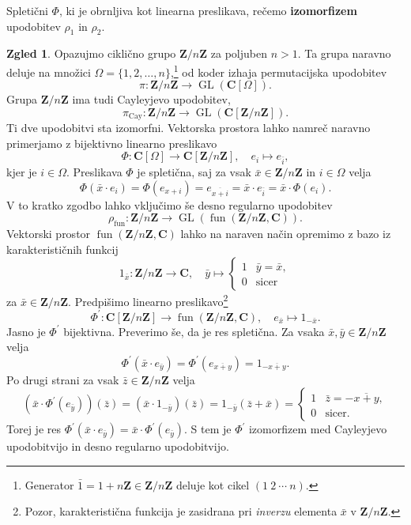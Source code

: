 \documentclass[11pt]{book}
\def\ZZ{\mathbf{Z}}
\def\CC{\mathbf{C}}
\DeclareMathOperator\fun{fun}
\DeclareMathOperator\GL{GL}
\DeclareMathOperator\Cay{Cay}
\def\definicija{\color{rdeca}\bf}
\theoremstyle{definition}
\theoremstyle{zgled}
\newtheorem{zgled}[theorem]{Zgled}
\theoremstyle{zgledbrezstevilke}
\theoremstyle{odprtproblem}
\theoremstyle{domacanaloga}
\theoremstyle{izrek}
\begin{document}
Spletični $\Phi$, ki je obrnljiva kot linearna preslikava, rečemo {\definicija izomorfizem} upodobitev $\rho_1$ in $\rho_2$. 

\begin{zgled}
    Opazujmo ciklično grupo $\ZZ/n\ZZ$ za poljuben $n > 1$.
    Ta grupa naravno deluje na množici $\Omega = \{ 1, 2, \dots, n \}$,\footnote{Generator $\bar 1 = 1 + n\ZZ \in \ZZ/n\ZZ$ deluje kot cikel $(1 \ 2 \ \cdots \ n)$.} od koder izhaja permutacijska upodobitev
    \[
        \pi \colon \ZZ/n\ZZ \to \GL(\CC[\Omega]).
    \]
    Grupa $\ZZ/n\ZZ$ ima tudi Cayleyjevo upodobitev,
    \[
        \pi_{\Cay} \colon \ZZ/n\ZZ \to \GL(\CC[\ZZ/n\ZZ]).
    \]
    Ti dve upodobitvi sta izomorfni. Vektorska prostora lahko namreč naravno primerjamo z bijektivno linearno preslikavo
    \[
        \Phi \colon \CC[\Omega] \to \CC[\ZZ/n\ZZ], \quad    
        e_i \mapsto e_{\bar i},
    \]
    kjer je $i \in \Omega$. Preslikava $\Phi$ je spletična, saj za vsak $\bar x \in \ZZ/n\ZZ$ in $i \in \Omega$ velja
    \[
        \Phi(\bar x \cdot e_i) 
        = \Phi(e_{x + i})
        = e_{\overline{x + i}}
        = \bar x \cdot e_{\bar i}
        = \bar x \cdot \Phi(e_i).
    \]
    V to kratko zgodbo lahko vključimo še desno regularno upodobitev
    \[
        \rho_{\fun} \colon \ZZ/n\ZZ \to \GL(\fun(\ZZ/n\ZZ,\CC)).
    \]
    Vektorski prostor $\fun(\ZZ/n\ZZ, \CC)$ lahko na naraven način opremimo z bazo iz karakterističnih funkcij
    \[
        1_{\bar x} \colon \ZZ/n\ZZ \to \CC, \quad
        \bar y \mapsto \begin{cases}
            1 & \bar y = \bar x, \\
            0 & \text{sicer}
        \end{cases}
    \]
    za $\bar x \in \ZZ/n\ZZ$. Predpišimo linearno preslikavo\footnote{Pozor, karakteristična funkcija je zasidrana pri {\em inverzu} elementa $\bar x$ v $\ZZ/n\ZZ$.}
    \[
        \Phi^\prime \colon \CC[\ZZ/n\ZZ] \to \fun(\ZZ/n\ZZ, \CC), \quad
        e_{\bar x} \mapsto 1_{- \bar x}.
    \]
    Jasno je $\Phi^\prime$ bijektivna. Preverimo še, da je res spletična. Za vsaka $\bar x, \bar y \in \ZZ/n\ZZ$ velja
    \[
        \Phi^\prime(\bar x \cdot e_{\bar y})
        = \Phi^\prime(e_{\overline{x + y}})
        = 1_{- \overline{x + y}}.
    \]
    Po drugi strani za vsak $\bar z \in \ZZ/n\ZZ$ velja
    \[
        \left( \bar x \cdot \Phi^\prime(e_{\bar y}) \right) (\bar z)
        = \left( \bar x \cdot 1_{- \bar y} \right) (\bar z)
        = 1_{- \bar y}(\bar z + \bar x)
        = \begin{cases}
            1 & \bar z = - \overline{x + y}, \\
            0 & \text{sicer}.
        \end{cases}
    \]
    Torej je res $\Phi^\prime(\bar x \cdot e_{\bar y}) = \bar x \cdot \Phi^\prime(e_{\bar y})$. S tem je $\Phi^\prime$ izomorfizem med Cayleyjevo upodobitvijo in desno regularno upodobitvijo.
\end{zgled}
\end{document}
